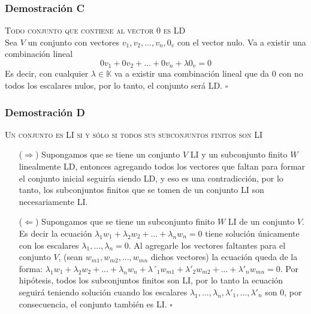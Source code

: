 \documentclass[a4paper,12pt]{article}
\begin{document}
\subsubsection{Demostración C}
\textsc{Todo conjunto que contiene al vector 0 es LD} \\
Sea $V$ un conjunto con vectores $v_1,v_2,...,v_n,0_v$ con el vector nulo. Va a existir una combinación lineal 
$$
0v_1+0v_2+...+0v_n+\lambda0_v=0
$$
Es decir, con cualquier $\lambda\in\mathds{K}$ va a existir una combinación lineal que da 0 con no todos los escalares nulos, por lo tanto, el conjunto será LD. $\square$
\subsubsection{Demostración D}
\textsc{Un conjunto es LI si y sólo si todos sus subconjuntos finitos son LI}
\begin{itemize}
    \item[($\Rightarrow$)] Supongamos que se tiene un conjunto $V$ LI y un subconjunto finito $W$ linealmente LD, entonces agregando todos los vectores que faltan para formar el conjunto inicial seguiría siendo LD, y eso es una contradicción, por lo tanto, los subconjuntos finitos que se tomen de un conjunto LI son necesariamente LI.
    \item[($\Leftarrow$)] Supongamos que se tiene un subconjunto finito $W$ LI de un conjunto $V$. Es decir la ecuación $\lambda_1w_1+\lambda_2w_2+...+\lambda_nw_n=0$ tiene solución únicamente con los escalares $\lambda_1,...,\lambda_n=0$. Al agregarle los vectores faltantes para el conjunto $V$, (sean $w_{m1},w_{m2},...,w_{mn}$ dichos vectores) la ecuación queda de la forma: $\lambda_1w_1+\lambda_2w_2+...+\lambda_nw_n + \lambda´_1w_{m1}+\lambda'_2w_{m2}+...+\lambda'_nw_{mn}=0$. Por hipótesis, todos los subconjuntos finitos son LI, por lo tanto la ecuación seguirá teniendo solución cuando los escalares $\lambda_1,...,\lambda_n,\lambda'_1,...,\lambda'_n$ son 0, por consecuencia, el conjunto también es LI. $\square$
\end{itemize}
\end{document}

